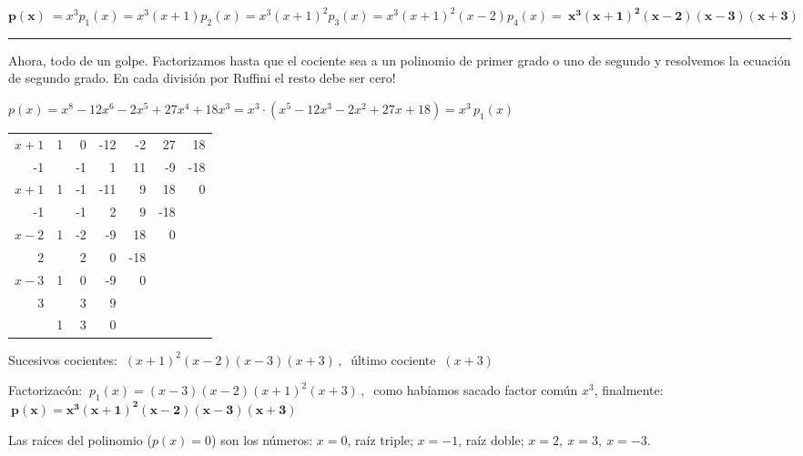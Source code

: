 \begin{miejemplo}
$\boldsymbol{p(x)}\ = x^3p_1(x)=x^3(x+1)p_2(x)=x^3(x+1)^2p_3(x)=x^3(x+1)^2(x-2)p_4(x)= \ \boldsymbol{ x^3(x+1)^2(x-2)(x-3)(x+3)}$


\begin{center}
\rule{250pt}{0.1pt}	
\end{center}

\vspace{5mm}

Ahora, todo de un golpe. Factorizamos hasta que el cociente sea  a un polinomio de primer grado o uno de segundo y resolvemos la ecuación de segundo grado. En cada división por Ruffini el resto debe ser cero!

\vspace{2mm} $p(x)=x^8-12x^6-2x^5+27x^4+18x^3=x^3\cdot(x^5-12x^3-2x^2+27x+18)=x^3\, p_1(x)$
\begin{table}[H]
\centering
\begin{tabular}{r|rrrrrr}
\textcolor{gris}{$x+1$} & 1 & 0 & -12 & -2 & 27 & 18 \\
-1 &  & -1 & 1 & 11 & -9 & -18 \\ \hline
\textcolor{gris}{$x+1$} & 1 & -1 & -11 & 9 & \multicolumn{1}{r|}{18} & 0 \\ \cline{7-7} 
-1 &  & -1 & 2 & 9 & -18 &  \\ \cline{1-6}
\textcolor{gris}{$x-2$} & 1 & -2 & -9 & \multicolumn{1}{r|}{18} & 0 &  \\ \cline{6-6}
2 &  & 2 & 0 & -18 &  &  \\ \cline{1-5}
\textcolor{gris}{$x-3$} & 1 & 0 & \multicolumn{1}{r|}{-9} & 0 &  &  \\ \cline{5-5}
3 &  & 3 & 9 &  &  &  \\ \cline{1-4}
 & 1 & \multicolumn{1}{r|}{3} & 0 &  &  &  \\ \cline{4-4}
\end{tabular}
\end{table}

\vspace{5mm}
Sucesivos cocientes: $\ (x + 1)^2 (x - 2) (x - 3) (x + 3) \, , \ $ último cociente $\ (x+3)$

\vspace{2mm} Factorizacón: $\ p_1(x)= (x - 3) (x - 2) (x + 1)^2 (x + 3)\, , \ $ como habíamos sacado factor común $x^3$, finalmente: $\ \boldsymbol{ p(x)=x^3   (x + 1)^2 (x - 2) (x - 3) (x + 3)}$

\vspace{2mm} Las raíces del polinomio ($p(x)=0$) son los números: $x=0$, raíz triple; $x=-1$, raíz doble;  $x=2, \ x=3, \ x=-3$. 

\vspace{2mm}
\end{miejemplo}


